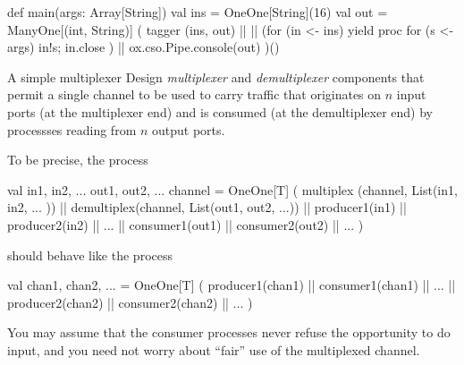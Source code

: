 \documentclass{concdistfoils}
\begin{document}
\begin{slide}
\begin{note}
\begin{obj}{}
  def main(args: Array[String])
  { val ins = OneOne[String](16)
    val out = ManyOne[(int, String)]
    (  tagger (ins, out)
    || || (for (in <- ins) yield proc { for (s <- args) in!s; in.close })
    || ox.cso.Pipe.console(out)
    )()
  }
\end{obj}
\end{note}
\begin{hideobj}{}
}
\end{hideobj}
\begin{ex**}{A simple multiplexer}
Design  \textit{multiplexer} and \textit{demultiplexer}
components that permit a single channel to be used
to carry traffic that originates on $n$ input ports 
(at the multiplexer end) and is consumed (at the
demultiplexer end) by processses reading from $n$ 
output ports.

To be precise, the process
\begin{scala}
        val in1, in2, ... out1, out2, ... channel = OneOne[T]
        (  multiplex  (channel, List(in1,  in2, ... ))
        || demultiplex(channel, List(out1, out2, ...))
        || producer1(in1)
        || producer2(in2)
        || ...
        || consumer1(out1)
        || consumer2(out2)
        || ...
        )
\end{scala}

should behave like the process

\begin{scala}
        val chan1, chan2, ... = OneOne[T]
        (  producer1(chan1) || consumer1(chan1) || ...
        || producer2(chan2) || consumer2(chan2) || ...
        )         
\end{scala}

You may assume that the consumer processes never refuse the opportunity to
do input, and you need not worry about ``fair'' use of the multiplexed channel.
\end{ex**}
\end{slide}
\end{document}
